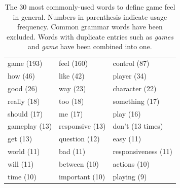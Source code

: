 \begin{table} \centering
\caption{The 30 most commonly-used words to define game feel in general. Numbers in parenthesis indicate usage frequency. Common grammar words have been excluded. Words with duplicate entries such as \textit{games} and \textit{game} have been combined into one.}
\label{table:mostWordsPost_GF}
\begin{tabular}{lll}
\toprule
game (193) & feel (160) & control (87)\\
how (46) & like (42) & player (34)\\
good (26) & way (23) & character (22)\\
really (18) & too (18) & something (17)\\
should (17) & me (17) & play (16)\\
gameplay (13) & responsive (13) & don't (13 times)\\
get (13) & question (12) & easy (11)\\
world (11) & bad (11) & responsiveness (11)\\
will (11) & between (10) & actions (10)\\
time (10) & important (10) & playing (9)\\
\bottomrule
\end{tabular}
\end{table}


